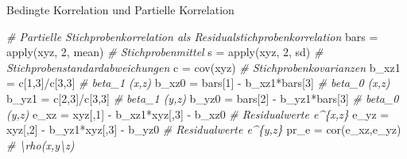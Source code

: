 \documentclass[
  8pt,
  ignorenonframetext,
]{beamer}
\newenvironment{Shaded}{\begin{snugshade}}{\end{snugshade}}
\newcommand{\CommentTok}[1]{\textcolor[rgb]{0.56,0.35,0.01}{\textit{#1}}}
\newcommand{\DecValTok}[1]{\textcolor[rgb]{0.00,0.00,0.81}{#1}}
\newcommand{\FunctionTok}[1]{\textcolor[rgb]{0.00,0.00,0.00}{#1}}
\newcommand{\NormalTok}[1]{#1}
\newcommand{\OtherTok}[1]{\textcolor[rgb]{0.56,0.35,0.01}{#1}}
\newcommand{\SpecialCharTok}[1]{\textcolor[rgb]{0.00,0.00,0.00}{#1}}
\begin{document}
\begin{frame}[fragile]{Bedingte Korrelation und Partielle Korrelation}
\begin{Shaded}
\begin{Highlighting}[]
\CommentTok{\# Partielle Stichprobenkorrelation als Residualstichprobenkorrelation}
\NormalTok{bars  }\OtherTok{=} \FunctionTok{apply}\NormalTok{(xyz, }\DecValTok{2}\NormalTok{, mean)                   }\CommentTok{\# Stichprobenmittel}
\NormalTok{s     }\OtherTok{=} \FunctionTok{apply}\NormalTok{(xyz, }\DecValTok{2}\NormalTok{, sd)                     }\CommentTok{\# Stichprobenstandardabweichungen}
\NormalTok{c     }\OtherTok{=} \FunctionTok{cov}\NormalTok{(xyz)                              }\CommentTok{\# Stichprobenkovarianzen}
\NormalTok{b\_xz1 }\OtherTok{=}\NormalTok{ c[}\DecValTok{1}\NormalTok{,}\DecValTok{3}\NormalTok{]}\SpecialCharTok{/}\NormalTok{c[}\DecValTok{3}\NormalTok{,}\DecValTok{3}\NormalTok{]                         }\CommentTok{\# beta\_1 (x,z)}
\NormalTok{b\_xz0 }\OtherTok{=}\NormalTok{ bars[}\DecValTok{1}\NormalTok{] }\SpecialCharTok{{-}}\NormalTok{ b\_xz1}\SpecialCharTok{*}\NormalTok{bars[}\DecValTok{3}\NormalTok{]               }\CommentTok{\# beta\_0 (x,z)}
\NormalTok{b\_yz1 }\OtherTok{=}\NormalTok{ c[}\DecValTok{2}\NormalTok{,}\DecValTok{3}\NormalTok{]}\SpecialCharTok{/}\NormalTok{c[}\DecValTok{3}\NormalTok{,}\DecValTok{3}\NormalTok{]                         }\CommentTok{\# beta\_1 (y,z)}
\NormalTok{b\_yz0 }\OtherTok{=}\NormalTok{ bars[}\DecValTok{2}\NormalTok{] }\SpecialCharTok{{-}}\NormalTok{ b\_yz1}\SpecialCharTok{*}\NormalTok{bars[}\DecValTok{3}\NormalTok{]               }\CommentTok{\# beta\_0 (y,z)}
\NormalTok{e\_xz  }\OtherTok{=}\NormalTok{ xyz[,}\DecValTok{1}\NormalTok{] }\SpecialCharTok{{-}}\NormalTok{ b\_xz1}\SpecialCharTok{*}\NormalTok{xyz[,}\DecValTok{3}\NormalTok{] }\SpecialCharTok{{-}}\NormalTok{ b\_xz0       }\CommentTok{\# Residualwerte e\^{}\{x,z\}}
\NormalTok{e\_yz  }\OtherTok{=}\NormalTok{ xyz[,}\DecValTok{2}\NormalTok{] }\SpecialCharTok{{-}}\NormalTok{ b\_yz1}\SpecialCharTok{*}\NormalTok{xyz[,}\DecValTok{3}\NormalTok{] }\SpecialCharTok{{-}}\NormalTok{ b\_yz0       }\CommentTok{\# Residualwerte e\^{}\{y,z\}}
\NormalTok{pr\_e  }\OtherTok{=} \FunctionTok{cor}\NormalTok{(e\_xz,e\_yz)                        }\CommentTok{\# \textbackslash{}rho(x,y\textbackslash{}z)}


\end{Highlighting}
\end{Shaded}
\end{frame}
\end{document}
